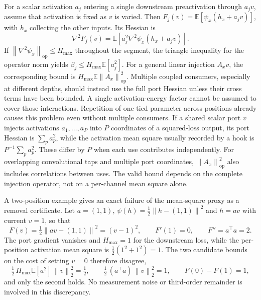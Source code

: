 \documentclass[10pt]{article}
\theoremstyle{paper}
\newcommand{\E}{\mathbb E}
\newcommand{\norm}[1]{\left\lVert #1\right\rVert}
\begin{document}
For a scalar activation $a_j$ entering a single downstream preactivation through $a_jv$, assume that activation is fixed as $v$ is varied. Then $F_j(v)=\E[\psi_x(h_x+a_jv)]$, with $h_x$ collecting the other inputs. Its Hessian is
\[
\nabla^2F_j(v)=\E[a_j^2\nabla^2\psi_x(h_x+a_jv)].
\]
If $\norm{\nabla^2\psi_x}_{\mathrm{op}}\le H_{\max}$ throughout the segment, the triangle inequality for the operator norm yields $\beta_j\le H_{\max}\E[a_j^2]$. For a general linear injection $A_xv$, the corresponding bound is $H_{\max}\E\norm{A_x}_{\mathrm{op}}^2$. Multiple coupled consumers, especially at different depths, should instead use the full port Hessian unless their cross terms have been bounded. A single activation-energy factor cannot be assumed to cover those interactions. Repetition of one tied parameter across positions already causes this problem even without multiple consumers. If a shared scalar port $v$ injects activations $a_1,\ldots,a_P$ into $P$ coordinates of a squared-loss output, its port Hessian is $\sum_p a_p^2$, while the activation mean square usually recorded by a hook is $P^{-1}\sum_p a_p^2$. These differ by $P$ when each use contributes independently. For overlapping convolutional taps and multiple port coordinates, $\norm{A_x}_{\mathrm{op}}^2$ also includes correlations between uses. The valid bound depends on the complete injection operator, not on a per-channel mean square alone.

A two-position example gives an exact failure of the mean-square proxy as a removal certificate. Let $a=(1,1)$, $\psi(h)=\tfrac12\norm{h-(1,1)}^2$ and $h=av$ with current $v=1$, so that
\begin{equation}
F(v)=\tfrac12\norm{av-(1,1)}^2=(v-1)^2,
\qquad
F'(1)=0,
\qquad
F''=a^\top a=2.
\label{eq:twoposition}
\end{equation}
The port gradient vanishes and $H_{\max}=1$ for the downstream loss, while the per-position activation mean square is $\tfrac12(1^2+1^2)=1$. The two candidate bounds on the cost of setting $v=0$ therefore disagree,
\begin{equation}
\tfrac12\,H_{\max}\E[a^2]\,\norm{v}_2^2=\tfrac12,
\qquad
\tfrac12\,(a^\top a)\,\norm{v}_2^2=1,
\qquad
F(0)-F(1)=1,
\label{eq:twopositionbounds}
\end{equation}
and only the second holds. No measurement noise or third-order remainder is involved in this discrepancy.
\end{document}
